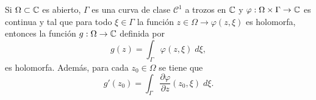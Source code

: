 \begin{colorary}
Si $\displaystyle \Omega\subset \mathbb{C} $ es abierto, $\displaystyle \Gamma  $ es una curva de clase $\displaystyle \mathcal{C}^{1} $ a trozos en $\displaystyle \mathbb{C} $ y $\displaystyle \varphi : \Omega \times \Gamma \to \mathbb{C} $ es continua y tal que para todo $\displaystyle \xi \in \Gamma $ la función $\displaystyle z \in \Omega \to \varphi\left(z, \xi\right) $ es holomorfa, entonces la función $\displaystyle g : \Omega \to \mathbb{C} $ definida por 
\[g\left(z\right)=\int _{\Gamma }\varphi\left(z, \xi\right) \; d\xi ,\]
es holomorfa. Además, para cada $\displaystyle z_{0} \in \Omega  $ se tiene que 
\[g'\left(z_{0}\right)=\int _{\Gamma }\frac{\partial \varphi}{\partial z}\left(z_{0}, \xi\right) \; d\xi .\]
\end{colorary}

